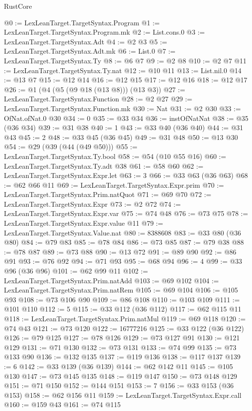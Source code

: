 \begin{lexlean}{RustCore}
\begin{coremodule}
@0 := LexLeanTarget.TargetSyntax.Program
@1 := LexLeanTarget.TargetSyntax.Program.mk
@2 := List.cons.{0}
@3 := LexLeanTarget.TargetSyntax.Adt
@4 := @2 @3
@5 := LexLeanTarget.TargetSyntax.Adt.mk
@6 := List.{0}
@7 := LexLeanTarget.TargetSyntax.Ty
@8 := @6 @7
@9 := @2 @8
@10 := @2 @7
@11 := LexLeanTarget.TargetSyntax.Ty.nat
@12 := @10 @11
@13 := List.nil.{0}
@14 := @13 @7
@15 := @12 @14
@16 := @12 @15
@17 := @12 @16
@18 := @12 @17
@26 := @1 (@4 (@5 (@9 @18 (@13 @8))) (@13 @3))
@27 := LexLeanTarget.TargetSyntax.Function
@28 := @2 @27
@29 := LexLeanTarget.TargetSyntax.Function.mk
@30 := Nat
@31 := @2 @30
@33 := OfNat.ofNat.{0} @30
@34 := 0
@35 := @33 @34
@36 := instOfNatNat
@38 := @35 (@36 @34)
@39 := @31 @38
@40 := 1
@43 := @33 @40 (@36 @40)
@44 := @31 @43
@45 := 2
@48 := @33 @45 (@36 @45)
@49 := @31 @48
@50 := @13 @30
@54 := @29 (@39 (@44 (@49 @50)))
@55 := LexLeanTarget.TargetSyntax.Ty.bool
@58 := @54 (@10 @55 @16)
@60 := LexLeanTarget.TargetSyntax.Ty.adt @38
@61 := @58 @60
@62 := LexLeanTarget.TargetSyntax.Expr.let
@63 := 3
@66 := @33 @63 (@36 @63)
@68 := @62 @66 @11
@69 := LexLeanTarget.TargetSyntax.Expr.prim
@70 := LexLeanTarget.TargetSyntax.Prim.natQuot
@71 := @69 @70
@72 := LexLeanTarget.TargetSyntax.Expr
@73 := @2 @72
@74 := LexLeanTarget.TargetSyntax.Expr.var
@75 := @74 @48
@76 := @73 @75
@78 := LexLeanTarget.TargetSyntax.Expr.value @11
@79 := LexLeanTarget.TargetSyntax.Value.nat
@80 := 8388608
@83 := @33 @80 (@36 @80)
@84 := @79 @83
@85 := @78 @84
@86 := @73 @85
@87 := @79 @38
@88 := @78 @87
@89 := @73 @88
@90 := @13 @72
@91 := @89 @90
@92 := @86 @91
@93 := @76 @92
@94 := @71 @93
@95 := @68 @94
@96 := 4
@99 := @33 @96 (@36 @96)
@101 := @62 @99 @11
@102 := LexLeanTarget.TargetSyntax.Prim.natAdd
@103 := @69 @102
@104 := LexLeanTarget.TargetSyntax.Prim.natRem
@105 := @69 @104
@106 := @105 @93
@108 := @73 @106 @90
@109 := @86 @108
@110 := @103 @109
@111 := @101 @110
@112 := 5
@115 := @33 @112 (@36 @112)
@117 := @62 @115 @11
@118 := LexLeanTarget.TargetSyntax.Prim.natMul
@119 := @69 @118
@120 := @74 @43
@121 := @73 @120
@122 := 16777216
@125 := @33 @122 (@36 @122)
@126 := @79 @125
@127 := @78 @126
@129 := @73 @127 @91
@130 := @121 @129
@131 := @71 @130
@132 := @73 @131
@133 := @74 @99
@135 := @73 @133 @90
@136 := @132 @135
@137 := @119 @136
@138 := @117 @137
@139 := 6
@142 := @33 @139 (@36 @139)
@144 := @62 @142 @11
@145 := @105 @130
@147 := @73 @145 @135
@148 := @119 @147
@150 := @73 @148 @129
@151 := @71 @150
@152 := @144 @151
@153 := 7
@156 := @33 @153 (@36 @153)
@158 := @62 @156 @11
@159 := LexLeanTarget.TargetSyntax.Expr.call
@160 := @159 @43
@161 := @74 @115

\end{coremodule}
\end{lexlean}
